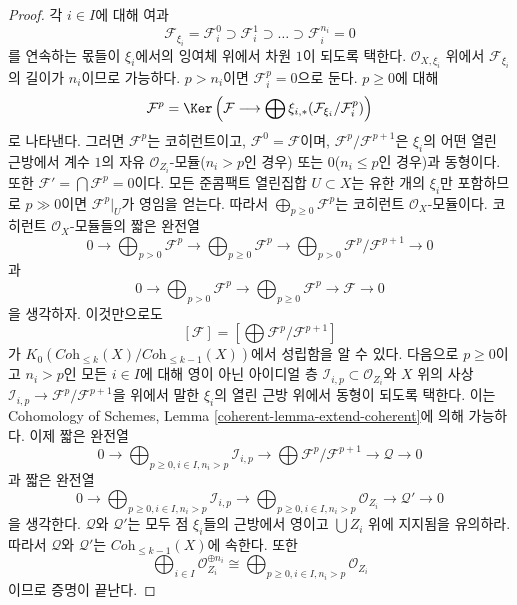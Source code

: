 \begin{proof}
\medskip\noindent
각 $i \in I$에 대해 여과
$$
\mathcal{F}_{\xi_i} = \mathcal{F}_i^0 \supset \mathcal{F}_i^1 \supset
\ldots \supset \mathcal{F}_i^{n_i} = 0
$$
를 연속하는 몫들이 $\xi_i$에서의 잉여체 위에서 차원 $1$이 되도록
택한다. $\mathcal{O}_{X, \xi_i}$ 위에서 $\mathcal{F}_{\xi_i}$의 길이가
$n_i$이므로 가능하다. $p > n_i$이면 $\mathcal{F}_i^p = 0$으로 둔다.
$p \geq 0$에 대해
$$
\mathcal{F}^p =
\Ker\left(\mathcal{F} \longrightarrow \bigoplus
\xi_{i, *}(\mathcal{F}_{\xi_i}/\mathcal{F}_i^p)\right)
$$
로 나타낸다. 그러면 $\mathcal{F}^p$는 코히런트이고,
$\mathcal{F}^0 = \mathcal{F}$이며, $\mathcal{F}^p/\mathcal{F}^{p + 1}$은
$\xi_i$의 어떤 열린 근방에서 계수 $1$의 자유
$\mathcal{O}_{Z_i}$-모듈($n_i > p$인 경우) 또는 $0$($n_i \leq p$인
경우)과 동형이다. 또한 $\mathcal{F}' = \bigcap \mathcal{F}^p = 0$이다.
모든 준콤팩트 열린집합 $U \subset X$는 유한 개의 $\xi_i$만 포함하므로
$p \gg 0$이면 $\mathcal{F}^p|_U$가 영임을 얻는다. 따라서
$\bigoplus_{p \geq 0} \mathcal{F}^p$는 코히런트
$\mathcal{O}_X$-모듈이다. 코히런트 $\mathcal{O}_X$-모듈들의 짧은 완전열
$$
0 \to
\bigoplus\nolimits_{p > 0} \mathcal{F}^p \to
\bigoplus\nolimits_{p \geq 0} \mathcal{F}^p \to
\bigoplus\nolimits_{p > 0} \mathcal{F}^p/\mathcal{F}^{p + 1} \to 0
$$
과
$$
0 \to
\bigoplus\nolimits_{p > 0} \mathcal{F}^p \to
\bigoplus\nolimits_{p \geq 0} \mathcal{F}^p \to
\mathcal{F} \to 0
$$
을 생각하자. 이것만으로도
$$
[\mathcal{F}] = [\bigoplus \mathcal{F}^p/\mathcal{F}^{p + 1}]
$$
가 $K_0(\textit{Coh}_{\leq k}(X)/\textit{Coh}_{\leq k - 1}(X))$에서
성립함을 알 수 있다. 다음으로 $p \geq 0$이고 $n_i > p$인 모든
$i \in I$에 대해 영이 아닌 아이디얼 층
$\mathcal{I}_{i, p} \subset \mathcal{O}_{Z_i}$와 $X$ 위의 사상
$\mathcal{I}_{i, p} \to \mathcal{F}^p/\mathcal{F}^{p + 1}$을 위에서 말한
$\xi_i$의 열린 근방 위에서 동형이 되도록 택한다. 이는 Cohomology of
Schemes, Lemma \ref{coherent-lemma-extend-coherent}에 의해 가능하다.
이제 짧은 완전열
$$
0 \to
\bigoplus\nolimits_{p \geq 0, i \in I, n_i > p} \mathcal{I}_{i, p}
\to
\bigoplus \mathcal{F}^p/\mathcal{F}^{p + 1} \to
\mathcal{Q} \to 0
$$
과 짧은 완전열
$$
0 \to
\bigoplus\nolimits_{p \geq 0, i \in I, n_i > p} \mathcal{I}_{i, p}
\to
\bigoplus\nolimits_{p \geq 0, i \in I, n_i > p} \mathcal{O}_{Z_i}
\to
\mathcal{Q}' \to 0
$$
을 생각한다. $\mathcal{Q}$와 $\mathcal{Q}'$는 모두 점 $\xi_i$들의
근방에서 영이고 $\bigcup Z_i$ 위에 지지됨을 유의하라. 따라서
$\mathcal{Q}$와 $\mathcal{Q}'$는 $\textit{Coh}_{\leq k - 1}(X)$에 속한다.
또한
$$
\bigoplus\nolimits_{i \in I} \mathcal{O}_{Z_i}^{\oplus n_i} \cong
\bigoplus\nolimits_{p \geq 0, i \in I, n_i > p} \mathcal{O}_{Z_i}
$$
이므로 증명이 끝난다.
\end{proof}

